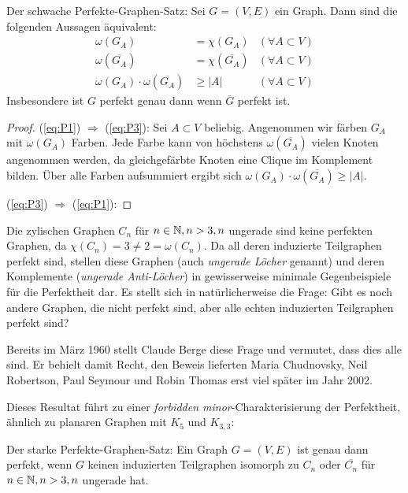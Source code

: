 \documentclass[../main.tex]{subfiles}
\begin{document}
\begin{satz}
    Der schwache Perfekte-Graphen-Satz: Sei $G = (V, E)$ ein Graph. Dann sind die folgenden Aussagen äquivalent:
    \begin{align}
        \omega(G_A) &= \chi(G_A) &(\forall A \subset V) \tag{P1}\label{eq:P1}\\
        \omega(\overline{G_A}) &= \chi(\overline{G_A}) &(\forall A \subset V) \tag{P2}\label{eq:P2}\\
        \omega(G_A) \cdot \omega(\overline{G_A}) &\geq |A| &(\forall A \subset V) \tag{P3}\label{eq:P3}
    \end{align}
    Insbesondere ist $G$ perfekt genau dann wenn $\overline G$ perfekt ist.
\end{satz}
\begin{proof}
    (\ref{eq:P1}) $\Rightarrow$ (\ref{eq:P3}): Sei $A \subset V$ beliebig. Angenommen wir färben $G_A$ mit $\omega(G_A)$ Farben. Jede Farbe kann von höchstens $\omega(\overline{G_A})$ vielen Knoten angenommen werden, da gleichgefärbte Knoten eine Clique im Komplement bilden. Über alle Farben aufsummiert ergibt sich $\omega(G_A) \cdot \omega(\overline{G_A}) \geq |A|$.

    (\ref{eq:P3}) $\Rightarrow$ (\ref{eq:P1}): 
\end{proof}

Die zylischen Graphen $C_n$ für $n \in \mathbb{N}, n > 3, n$ ungerade sind keine perfekten Graphen, da $\chi(C_n) = 3 \neq 2 = \omega(C_n)$. Da all deren induzierte Teilgraphen perfekt sind, stellen diese Graphen (auch \emph{ungerade Löcher} genannt) und deren Komplemente (\emph{ungerade Anti-Löcher}) in gewisserweise minimale Gegenbeispiele für die Perfektheit dar. Es stellt sich in natürlicherweise die Frage: Gibt es noch andere Graphen, die nicht perfekt sind, aber alle echten induzierten Teilgraphen perfekt sind?

Bereits im März 1960 stellt Claude Berge diese Frage und vermutet, dass dies alle sind.\cite{das_Buch} Er behielt damit Recht, den Beweis lieferten Maria Chudnovsky, Neil Robertson, Paul Seymour und Robin Thomas\cite{chudnovsky2002strongperfectgraphtheorem} erst viel später im Jahr 2002.

Dieses Resultat führt zu einer \emph{forbidden minor}-Charakterisierung der Perfektheit, ähnlich zu planaren Graphen mit $K_5$ und $K_{3,3}$:

\begin{satz}
    Der starke Perfekte-Graphen-Satz: Ein Graph $G = (V, E)$ ist genau dann perfekt, wenn $G$ keinen induzierten Teilgraphen isomorph zu $C_n$ oder $\overline{C_n}$ für $n \in \mathbb{N}, n > 3, n$ ungerade hat.
\end{satz}


\end{document}
